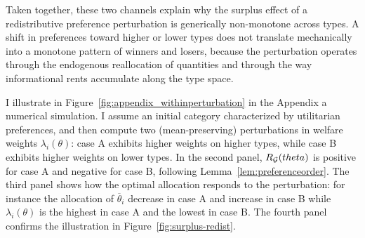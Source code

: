 \documentclass{class}
\begin{document}
Taken together, these two channels explain why the surplus effect of a redistributive preference perturbation is generically non-monotone across types. A shift in preferences toward higher or lower types does not translate mechanically into a monotone pattern of winners and losers, because the perturbation operates through the endogenous reallocation of quantities and through the way informational rents accumulate along the type space.

 I illustrate in Figure~\ref{fig:appendix_withinperturbation} in the Appendix a numerical simulation. I assume an initial category characterized by utilitarian preferences, and then compute two (mean-preserving) perturbations in welfare weights $\lambda_i(\theta)$: case A exhibits higher weights on higher types, while case B exhibits higher weights on lower types. In the second panel, $R_{\mathcal{G}}(theta)$ is positive for case A and negative for case B, following Lemma~\ref {lem:preferenceorder}. The third panel shows how the optimal allocation responds to the perturbation: for instance the allocation of $\overline{\theta}_i$ decrease in case A and increase in case B while $\lambda_i(\theta)$ is the highest in case A and the lowest in case B. The fourth panel confirms the illustration in Figure~\ref{fig:surplus-redist}.
\end{document}
